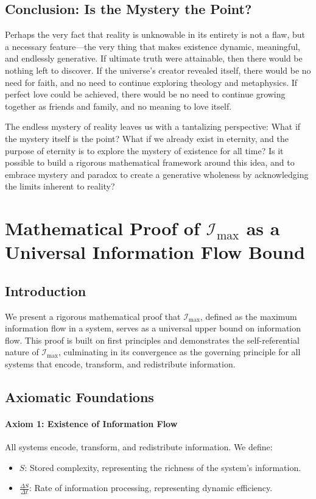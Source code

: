 \documentclass[12pt]{article}
\begin{document}
\subsection{Conclusion: Is the Mystery the Point?}
Perhaps the very fact that reality is unknowable in its entirety is not a flaw, but a necessary feature—the very thing that makes existence dynamic, meaningful, and endlessly generative. If ultimate truth were attainable, then there would be nothing left to discover. If the universe's creator revealed itself, there would be no need for faith, and no need to continue exploring theology and metaphysics. If perfect love could be achieved, there would be no need to continue growing together as friends and family, and no meaning to love itself.

The endless mystery of reality leaves us with a tantalizing perspective: What if the mystery itself is the point? What if we already exist in eternity, and the purpose of eternity is to explore the mystery of existence for all time? Is it possible to build a rigorous mathematical framework around this idea, and to embrace mystery and paradox to create a generative wholeness by acknowledging the limits inherent to reality?


\section{Mathematical Proof of \(\mathcal{I}_{\text{max}}\) as a Universal Information Flow Bound}

\subsection{Introduction}
We present a rigorous mathematical proof that \(\mathcal{I}_{\text{max}}\), defined as the maximum information flow in a system, serves as a universal upper bound on information flow. This proof is built on first principles and demonstrates the self-referential nature of \(\mathcal{I}_{\text{max}}\), culminating in its convergence as the governing principle for all systems that encode, transform, and redistribute information.

\subsection{Axiomatic Foundations}

\paragraph{Axiom 1: Existence of Information Flow}
All systems encode, transform, and redistribute information. We define:
\begin{itemize}
    \item \(S\): Stored complexity, representing the richness of the system's information.
    \item \(\frac{\Delta S}{\Delta t}\): Rate of information processing, representing dynamic efficiency.
\end{itemize}
\end{document}
